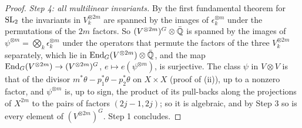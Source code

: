 \begin{proof}
\emph{Step 4: all multilinear invariants.} By the first fundamental theorem
for $\operatorname{SL}_{2}$ the invariants in $V_{k}^{\otimes2m}$ are spanned by the images
of $\epsilon_{k}^{\otimes m}$ under the permutations of the $2m$ factors. So
$(V^{\otimes2m})^{G}\otimes\bar{\mathbb{Q}}$ is spanned by the images of
$\psi^{\otimes m}=\bigotimes_{k}\epsilon_{k}^{\otimes m}$ under the operators
that permute the factors of the three $V_{k}^{\otimes2m}$ separately, which
lie in $\operatorname{End}_{G}(V^{\otimes2m})\otimes\bar{\mathbb{Q}}$, and the map
$\operatorname{End}_{G}(V^{\otimes2m})\to(V^{\otimes2m})^{G}$, $e\mapsto e(\psi^{\otimes m})$,
is surjective. The class $\psi$ in $V\otimes V$ is that of the divisor
$m^{*}\theta-p_{1}^{*}\theta-p_{2}^{*}\theta$ on $X\times X$ (proof of
(ii)), up to a nonzero factor, and $\psi^{\otimes m}$ is,
up to sign, the product of its pull-backs along the projections of $X^{2m}$
to the pairs of factors $(2j-1,2j)$; so it is algebraic, and by Step 3 so is
every element of $(V^{\otimes2m})^{G}$. Step 1 concludes.
\end{proof}

